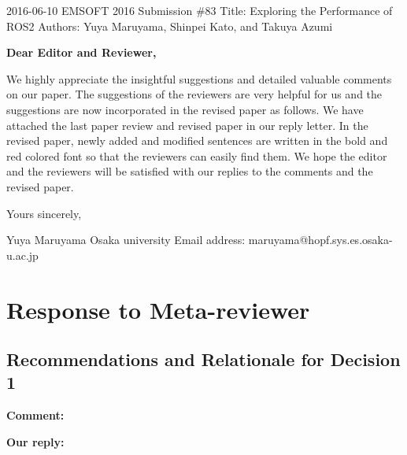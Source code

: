 \documentclass{article}
\begin{document}
\begin{flushleft}
  2016-06-10\newline
  EMSOFT 2016 Submission \#83\newline
  Title: Exploring the Performance of ROS2\newline
  Authors: Yuya Maruyama, Shinpei Kato, and Takuya Azumi\newline
\end{flushleft}
\textbf{Dear Editor and Reviewer,}\newline

We highly appreciate the insightful suggestions and detailed valuable comments on our paper. The suggestions of the reviewers are very helpful for us and the suggestions are now incorporated in the revised paper as follows. We have attached the last paper review and revised paper in our reply letter. In the revised paper, newly added and modified sentences are written in the bold and red colored font so that the reviewers can easily find them. We hope the editor and the reviewers will be satisfied with our replies to the comments and the revised paper.\newline\newline

\begin{flushleft}
  Yours sincerely,\newline

  Yuya Maruyama\newline
  Osaka university\newline
  Email address: maruyama@hopf.sys.es.osaka-u.ac.jp\newline
\end{flushleft}

\clearpage


\section{Response to Meta-reviewer}
\subsection{Recommendations and Relationale for Decision 1}

\begin{flushleft}
  \textbf{Comment:}
\end{flushleft}

\begin{flushleft}
  \textbf{Our reply:}
\end{flushleft}
\end{document}
